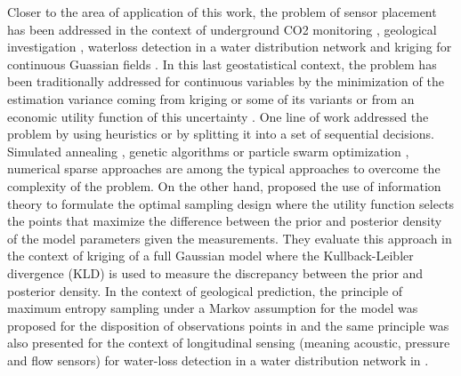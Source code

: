 {Closer to the area of application of this work,  the problem of sensor placement has been addressed
in the context of underground CO2 monitoring \citep{magnant_2011a}, geological investigation \citep{xu_2017a}, waterloss detection in a water distribution network \citep{christodoulou_2013a} and kriging for continuous Guassian fields \citep{abellan_2010a,peschel_1991a,cressie_1990,marchant_2007,zidek_2000}. In this last geostatistical context, the problem has been traditionally addressed for continuous variables by the minimization of the estimation variance coming from kriging or some of its variants \citep{McBratney1981a,McBratney1981b,olea1984_a,gaoetal1996,brusheuvelink2007,Vasat2010,cressie_1990,marchant_2007} or from an economic utility function of this uncertainty \citep{aspiebarnes1990}.  One line of work addressed the problem by using heuristics or by splitting it into a set of sequential decisions. Simulated annealing \citep{christakoskillam1993,vangroenigenetal1999,norrenadeutsch2002}, genetic algorithms \citep{bittencourthorne1997} or particle swarm optimization \citep{afsharietal2014}, numerical sparse approaches \citep{magnant_2011a} are among the typical approaches to overcome the complexity of the problem.
On the other hand, \citep{abellan_2010a} proposed the use of information theory to formulate the optimal sampling design where the utility function selects the points that maximize the difference between the prior and posterior density of the model parameters given the measurements. They evaluate this approach in the context of kriging of a full Gaussian model where the Kullback-Leibler divergence (KLD) is used to measure the discrepancy between the prior  and posterior density.
In the context of geological prediction, the principle of maximum entropy sampling under a Markov assumption for the model
was proposed for the disposition of observations points in \citep{xu_2017a} and the same principle was also presented for 
the context of longitudinal sensing (meaning acoustic, pressure and flow sensors) for water-loss detection in a water distribution network in \citep{christodoulou_2013a}.}

